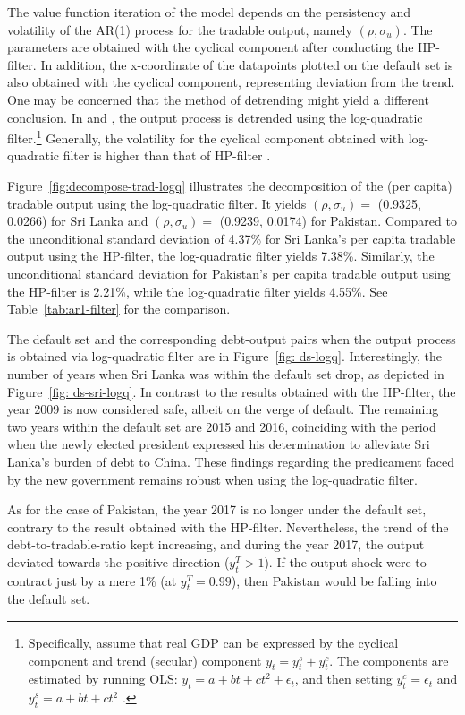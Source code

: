 The value function iteration of the model depends on the persistency and volatility of the AR(1) process for the tradable output, namely $(\rho, \sigma_u)$. The parameters are obtained with the cyclical component after conducting the HP-filter. In addition, the x-coordinate of the datapoints plotted on the default set is also obtained with the cyclical component, representing deviation from the trend. One may be concerned that the method of detrending might yield a different conclusion. In \citet{Na-18} and \cite{Hinrichsen_2020-chapter4}, the output process is detrended using the log-quadratic filter.\footnote{
    Specifically, assume that real GDP can be expressed by the cyclical component and trend (secular) component $y_t = y^s_t + y^c_t$. The components are estimated by running OLS: $y_t = a + bt + ct^2 + \epsilon_t$, and then setting $y^c_t = \epsilon_t$ and $y^s_t = a + bt + ct^2$ \citep{Uribe-Schmitt-Grohe-textbook}.
}
Generally, the volatility for the cyclical component obtained with log-quadratic filter is higher than that of HP-filter \citep{Uribe-Schmitt-Grohe-textbook}.

Figure~\ref{fig:decompose-trad-logq} illustrates the decomposition of the (per capita) tradable output using the log-quadratic filter. It yields $(\rho, \sigma_u)=$ (0.9325, 0.0266) for Sri Lanka and $(\rho, \sigma_u)=$ (0.9239, 0.0174) for Pakistan. Compared to the unconditional standard deviation of 4.37\% for Sri Lanka's per capita tradable output using the HP-filter, the log-quadratic filter yields 7.38\%. Similarly, the unconditional standard deviation for Pakistan's per capita tradable output using the HP-filter is 2.21\%, while the log-quadratic filter yields 4.55\%.
See Table~\ref{tab:ar1-filter} for the comparison.

The default set and the corresponding debt-output pairs when the output process is obtained via log-quadratic filter are in Figure~\ref{fig: ds-logq}. Interestingly, the number of years when Sri Lanka was within the default set drop, as depicted in Figure~\ref{fig: ds-sri-logq}.
In contrast to the results obtained with the HP-filter, the year 2009 is now considered safe, albeit on the verge of default. The remaining two years within the default set are 2015 and 2016, coinciding with the period when the newly elected president expressed his determination to alleviate Sri Lanka's burden of debt to China. These findings regarding the predicament faced by the new government remains robust when using the log-quadratic filter.

As for the case of Pakistan, the year 2017 is no longer under the default set, contrary to the result obtained with the HP-filter. Nevertheless, the trend of the debt-to-tradable-ratio kept increasing, and during the year 2017, the output deviated towards the positive direction ($y^T_t > 1$). If the output shock were to contract just by a mere 1\% (at $y^T_t = 0.99$), then Pakistan would be falling into the default set.